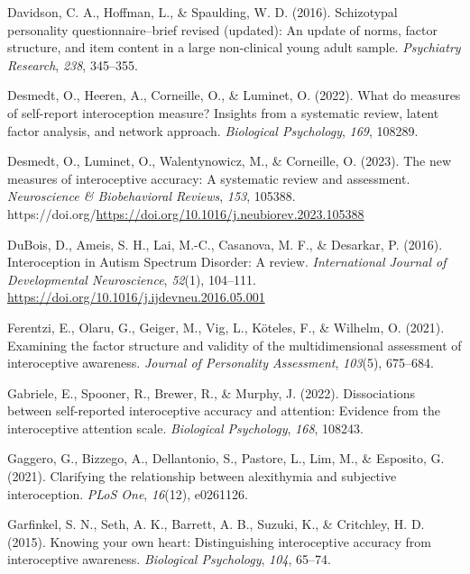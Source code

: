 \documentclass[
  jou,
  floatsintext,
  longtable,
  nolmodern,
  notxfonts,
  notimes,
  colorlinks=true,linkcolor=blue,citecolor=blue,urlcolor=blue]{apa7}
\newlength{\cslhangindent}
\newenvironment{CSLReferences}[2] %
 {\begin{list}{}{%
  \setlength{\itemindent}{0pt}
  \setlength{\leftmargin}{0pt}
  \setlength{\parsep}{0pt}
  \ifodd #1
   \setlength{\leftmargin}{\cslhangindent}
   \setlength{\itemindent}{-1\cslhangindent}
  \fi
  \setlength{\itemsep}{#2\baselineskip}}}
 {\end{list}}
\begin{document}
\begin{CSLReferences}{1}{0}
Davidson, C. A., Hoffman, L., \& Spaulding, W. D. (2016). Schizotypal
personality questionnaire--brief revised (updated): An update of norms,
factor structure, and item content in a large non-clinical young adult
sample. \emph{Psychiatry Research}, \emph{238}, 345--355.

Desmedt, O., Heeren, A., Corneille, O., \& Luminet, O. (2022). What do
measures of self-report interoception measure? Insights from a
systematic review, latent factor analysis, and network approach.
\emph{Biological Psychology}, \emph{169}, 108289.

Desmedt, O., Luminet, O., Walentynowicz, M., \& Corneille, O. (2023).
The new measures of interoceptive accuracy: A systematic review and
assessment. \emph{Neuroscience \& Biobehavioral Reviews}, \emph{153},
105388.
https://doi.org/\url{https://doi.org/10.1016/j.neubiorev.2023.105388}

DuBois, D., Ameis, S. H., Lai, M.-C., Casanova, M. F., \& Desarkar, P.
(2016). Interoception in Autism Spectrum Disorder: A review.
\emph{International Journal of Developmental Neuroscience},
\emph{52}(1), 104--111.
\url{https://doi.org/10.1016/j.ijdevneu.2016.05.001}

Ferentzi, E., Olaru, G., Geiger, M., Vig, L., Köteles, F., \& Wilhelm,
O. (2021). Examining the factor structure and validity of the
multidimensional assessment of interoceptive awareness. \emph{Journal of
Personality Assessment}, \emph{103}(5), 675--684.

Gabriele, E., Spooner, R., Brewer, R., \& Murphy, J. (2022).
Dissociations between self-reported interoceptive accuracy and
attention: Evidence from the interoceptive attention scale.
\emph{Biological Psychology}, \emph{168}, 108243.

Gaggero, G., Bizzego, A., Dellantonio, S., Pastore, L., Lim, M., \&
Esposito, G. (2021). Clarifying the relationship between alexithymia and
subjective interoception. \emph{PLoS One}, \emph{16}(12), e0261126.

Garfinkel, S. N., Seth, A. K., Barrett, A. B., Suzuki, K., \& Critchley,
H. D. (2015). Knowing your own heart: Distinguishing interoceptive
accuracy from interoceptive awareness. \emph{Biological Psychology},
\emph{104}, 65--74.


\end{CSLReferences}
\end{document}
